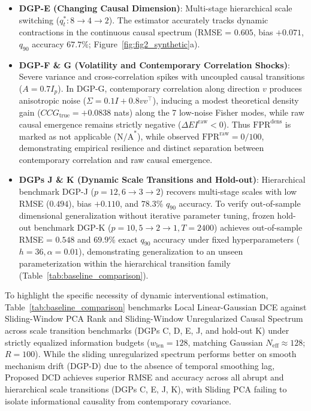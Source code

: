 \documentclass[10pt,twocolumn,journal]{article}
\begin{document}
\begin{itemize}[noitemsep,topsep=2pt,parsep=1pt]
    \item \textbf{DGP-E (Changing Causal Dimension)}: Multi-stage hierarchical scale switching ($q_t^*: 8 \to 4 \to 2$). The estimator accurately tracks dynamic contractions in the continuous causal spectrum (RMSE = $0.605$, bias $+0.071$, $q_{90}$ accuracy $67.7\%$; Figure~\ref{fig:fig2_synthetic}a).
    \item \textbf{DGP-F \& G (Volatility and Contemporary Correlation Shocks)}: Severe variance and cross-correlation spikes with uncoupled causal transitions ($A = 0.7 I_p$). In DGP-G, contemporary correlation along direction $v$ produces anisotropic noise ($\Sigma = 0.1 I + 0.8 v v^\top$), inducing a modest theoretical density gain ($CCG_{\text{true}} = +0.0838$ nats) along the 7 low-noise Fisher modes, while raw causal emergence remains strictly negative ($\Delta EI^{\text{raw}} < 0$). Thus $\text{FPR}^{\text{dens}}$ is marked as not applicable ($\text{N/A}^*$), while observed $\text{FPR}^{\text{raw}} = 0/100$, demonstrating empirical resilience and distinct separation between contemporary correlation and raw causal emergence.
    \item \textbf{DGPs J \& K (Dynamic Scale Transitions and Hold-out)}: Hierarchical benchmark DGP-J ($p=12, 6 \to 3 \to 2$) recovers multi-stage scales with low RMSE ($0.494$), bias $+0.110$, and $78.3\%$ $q_{90}$ accuracy. To verify out-of-sample dimensional generalization without iterative parameter tuning, frozen hold-out benchmark DGP-K ($p=10, 5 \to 2 \to 1, T=2400$) achieves out-of-sample RMSE = $0.548$ and $69.9\%$ exact $q_{90}$ accuracy under fixed hyperparameters ($h=36, \alpha=0.01$), demonstrating generalization to an unseen parameterization within the hierarchical transition family (Table~\ref{tab:baseline_comparison}).
\end{itemize}
To highlight the specific necessity of dynamic interventional estimation, Table~\ref{tab:baseline_comparison} benchmarks Local Linear-Gaussian DCE against Sliding-Window PCA Rank and Sliding-Window Unregularized Causal Spectrum across scale transition benchmarks (DGPs C, D, E, J, and hold-out K) under strictly equalized information budgets ($w_{\text{len}}=128$, matching Gaussian $N_{\text{eff}} \approx 128$; $R=100$). While the sliding unregularized spectrum performs better on smooth mechanism drift (DGP-D) due to the absence of temporal smoothing lag, Proposed DCD achieves superior RMSE and accuracy across all abrupt and hierarchical scale transitions (DGPs C, E, J, K), with Sliding PCA failing to isolate informational causality from contemporary covariance.
\end{document}
